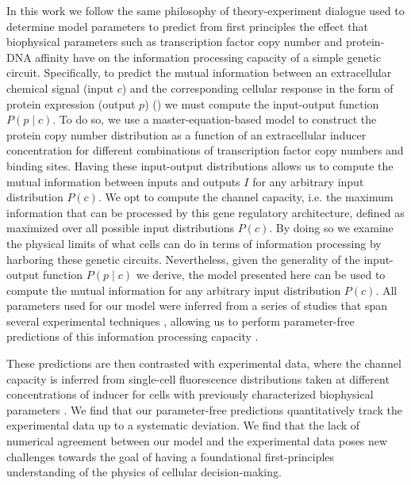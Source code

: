 In this work we follow the same philosophy of theory-experiment dialogue used
to determine model parameters to predict from first principles the effect that
biophysical parameters such as transcription factor copy number and protein-DNA
affinity have on the information processing capacity of a simple genetic
circuit. Specifically, to predict the mutual information between an
extracellular chemical signal (input $c$) and the corresponding cellular
response in the form of protein expression (output $p$) ()
we must compute the input-output function $P(p \mid c)$. To do so, we use a
master-equation-based model to construct the protein copy number distribution
as a function of an extracellular inducer concentration for different
combinations of transcription factor copy numbers and binding sites. Having
these input-output distributions allows us to compute the mutual information
between inputs and outputs $I$ for any arbitrary input distribution $P(c)$. We
opt to compute the channel capacity, i.e. the maximum information that can be
processed by this gene regulatory architecture, defined as
 maximized over all possible input distributions $P(c)$.
By doing so we examine the physical limits of what cells can do in terms of
information processing by harboring these genetic circuits. Nevertheless, given
the generality of the input-output function $P(p \mid c)$ we derive, the model
presented here can be used to compute the mutual information for any arbitrary
input distribution $P(c)$. All parameters used for our model were inferred from
a series of studies that span several experimental techniques
\cite{Garcia2011c, Jones2014a, Brewster2014, Razo-Mejia2018}, allowing us to
perform parameter-free predictions of this information processing capacity
\cite{Phillips2019}.

These predictions are then contrasted with experimental data, where the channel
capacity is inferred from single-cell fluorescence distributions taken at
different concentrations of inducer for cells with previously characterized
biophysical parameters \cite{Garcia2011c, Razo-Mejia2018}. We find that our
parameter-free predictions quantitatively track the experimental data up to a
systematic deviation. We find that the lack of numerical agreement between our
model and the experimental data poses new challenges towards the goal of having
a foundational first-principles understanding of the physics of cellular
decision-making.

